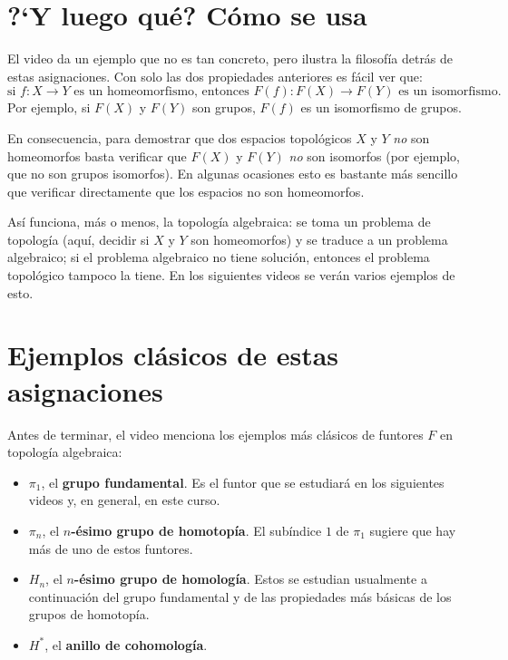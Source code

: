 \documentclass[11pt]{article}
\begin{document}
\section*{?`Y luego qué? Cómo se usa}

El video da un ejemplo que no es tan concreto, pero ilustra la filosofía detrás de estas asignaciones. Con solo las dos propiedades anteriores es fácil ver que:
\[
  \text{si } f\colon X\to Y \text{ es un homeomorfismo, entonces } F(f)\colon F(X)\to F(Y) \text{ es un isomorfismo.}
\]
Por ejemplo, si $F(X)$ y $F(Y)$ son grupos, $F(f)$ es un isomorfismo de grupos.

En consecuencia, para demostrar que dos espacios topológicos $X$ y $Y$ \emph{no} son homeomorfos basta verificar que $F(X)$ y $F(Y)$ \emph{no} son isomorfos (por ejemplo, que no son grupos isomorfos). En algunas ocasiones esto es bastante más sencillo que verificar directamente que los espacios no son homeomorfos.

Así funciona, más o menos, la topología algebraica: se toma un problema de topología (aquí, decidir si $X$ y $Y$ son homeomorfos) y se traduce a un problema algebraico; si el problema algebraico no tiene solución, entonces el problema topológico tampoco la tiene. En los siguientes videos se verán varios ejemplos de esto.

\section*{Ejemplos clásicos de estas asignaciones}

Antes de terminar, el video menciona los ejemplos más clásicos de funtores $F$ en topología algebraica:
\begin{itemize}
  \item $\pi_1$, el \textbf{grupo fundamental}. Es el funtor que se estudiará en los siguientes videos y, en general, en este curso.
  \item $\pi_n$, el \textbf{$n$-ésimo grupo de homotopía}. El subíndice $1$ de $\pi_1$ sugiere que hay más de uno de estos funtores.
  \item $H_n$, el \textbf{$n$-ésimo grupo de homología}. Estos se estudian usualmente a continuación del grupo fundamental y de las propiedades más básicas de los grupos de homotopía.
  \item $H^{*}$, el \textbf{anillo de cohomología}.
\end{itemize}
\end{document}
